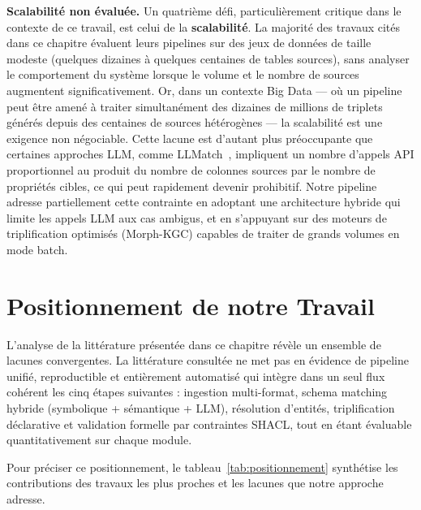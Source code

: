 \textbf{Scalabilité non évaluée.}
Un quatrième défi, particulièrement critique dans
le contexte de ce travail, est celui de la \textbf{scalabilité}.
La majorité des travaux cités dans ce chapitre évaluent
leurs pipelines sur des jeux de données de taille modeste
(quelques dizaines à quelques centaines de tables sources),
sans analyser le comportement du système lorsque
le volume et le nombre de sources augmentent significativement.
Or, dans un contexte Big Data --- où un pipeline peut être
amené à traiter simultanément des dizaines de millions de
triplets générés depuis des centaines de sources hétérogènes
--- la scalabilité est une exigence non négociable.
Cette lacune est d'autant plus préoccupante que certaines
approches LLM, comme LLMatch~\cite{llmatch2025},
impliquent un nombre d'appels API proportionnel au produit
du nombre de colonnes sources par le nombre de propriétés
cibles, ce qui peut rapidement devenir prohibitif.
Notre pipeline adresse partiellement cette contrainte
en adoptant une architecture hybride qui limite les appels
LLM aux cas ambigus, et en s'appuyant sur des moteurs
de triplification optimisés (Morph-KGC) capables
de traiter de grands volumes en mode batch.

\section{Positionnement de notre Travail}\label{sec:positionnement}
L'analyse de la littérature présentée dans ce chapitre révèle un ensemble de lacunes convergentes. La littérature consultée ne met pas en évidence de pipeline unifié, reproductible et entièrement automatisé qui intègre dans un seul flux cohérent les cinq étapes suivantes : ingestion multi-format, schema matching hybride (symbolique + sémantique + LLM), résolution d'entités, triplification déclarative et validation formelle par contraintes SHACL, tout en étant évaluable quantitativement sur chaque module.

Pour préciser ce positionnement, le tableau~\ref{tab:positionnement} synthétise les contributions des travaux les plus proches et les lacunes que notre approche adresse.


